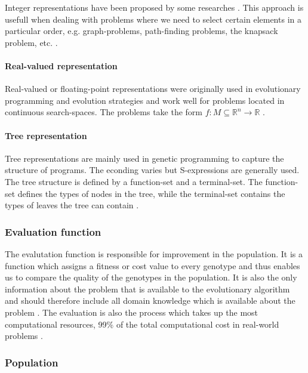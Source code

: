 Integer representations have been proposed by some researches \cite{unter611evolutionary}. This approach is usefull when dealing with problems where we need to select certain elements in a particular order, e.g. graph-problems, path-finding problems, the knapsack problem, etc. \cite{Eiben201511}.


\paragraph{Real-valued representation}

Real-valued or floating-point representations were originally used in evolutionary programming and evolution strategies and work well for problems located in continuous search-spaces. The problems take the form $f:M\subseteq \mathbb{R}^n \rightarrow \mathbb{R} $ \cite{back1997evolutionary}.

\paragraph{Tree representation}

Tree representations are mainly used in genetic programming to capture the structure of programs. The econding varies but S-expressions are generally used. The tree structure is defined by a function-set and a terminal-set. The function-set defines the types of nodes in the tree, while the terminal-set contains the types of leaves the tree can contain \cite{Eiben201511}.

\subsubsection{Evaluation function}

The evalutation function is responsible for improvement in the population. It is a function which assigns a fitness or cost value to every genotype and thus enables us to compare the quality of the genotypes in the population. It is also the only information about the problem that is available to the evolutionary algorithm and should therefore include all domain knowledge which is available about the problem \cite{Eiben2015_whatevolutionary}. The evaluation is also the process which takes up the most computational resources, 99\% of the total computational cost in real-world problems \cite{Eiben20021}.

\subsubsection{Population}


